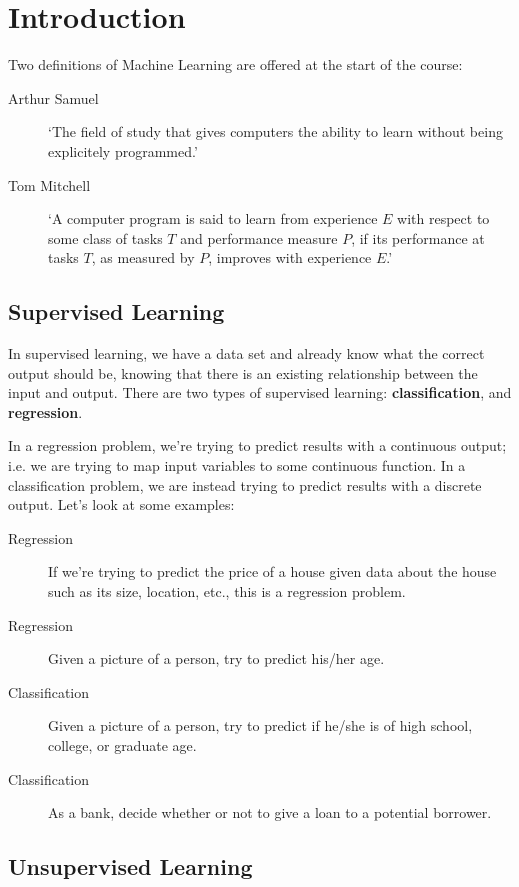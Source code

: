 \chapter{Introduction}
\label{chap:introduction}

Two definitions of Machine Learning are offered at the start of the course:
\begin{description}
\item[Arthur Samuel] `The field of study that gives computers the ability to learn without being explicitely programmed.'
\item[Tom Mitchell] `A computer program is said to learn from experience $E$ with respect to some class of tasks $T$ and performance measure $P$, if its performance at tasks $T$, as measured by $P$, improves with experience $E$.'
\end{description}


\section{Supervised Learning}
\label{chapintro-sect:suplearn}

In supervised learning, we have a data set and already know what the correct output should be,  knowing that there is an existing relationship between the input and output. There are two types of supervised learning: \textbf{classification}, and \textbf{regression}. 

In a regression problem, we're trying to predict results with a continuous output; i.e. we are trying to map input variables to some continuous function. In a classification problem, we are instead trying to predict results with a discrete output. Let's look at some examples:

\begin{description}
\item[Regression] If we're trying to predict the price of a house given data about the house such as its size, location, etc., this is a regression problem. 
\item[Regression] Given a picture of a person, try to predict his/her age.
\item[Classification] Given a picture of a person, try to predict if he/she is of high school, college, or graduate age.
\item[Classification] As a bank, decide whether or not to give a loan to a potential borrower. 
\end{description}

\section{Unsupervised Learning}
\label{chapintro-sect:unsuplearn}

